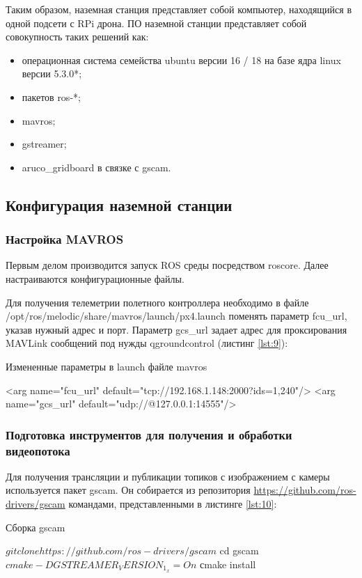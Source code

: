 Таким образом, наземная станция представляет собой компьютер, находящийся в одной подсети с RPi дрона.
ПО наземной станции представляет собой совокупность таких решений как:
\begin{itemize}
	\item операционная система семейства ubuntu версии 16 / 18 на базе ядра linux версии 5.3.0*;
	\item пакетов ros-*;
	\item mavros;
	\item gstreamer;
	\item aruco\_gridboard в связке с gscam.
\end{itemize}

\subsection{Конфигурация наземной станции}

\subsubsection{Настройка MAVROS}

Первым делом производится запуск ROS среды посредством roscore. Далее настраиваются конфигурационные файлы.

Для получения телеметрии полетного контроллера необходимо в файле /opt/ros/melodic/share/mavros/launch/px4.launch поменять параметр fcu\_url, указав нужный адрес и порт. Параметр gcs\_url задает адрес для проксирования MAVLink сообщений под нужды qgroundcontrol (листинг \ref{lst:9}):
\begin{Program}[H]
	\caption{Измененные параметры в launch файле mavros} \label{lst:9}
	\begin{MyCode}
	<arg name="fcu_url" default="tcp://192.168.1.148:2000?ids=1,240"/>   
	<arg name="gcs_url" default="udp://@127.0.0.1:14555"/>
	\end{MyCode}
\end{Program}

\subsubsection{Подготовка инструментов для получения и обработки видеопотока}
Для получения трансляции и публикации топиков с изображением с камеры используется пакет gscam. Он собирается из репозитория \url{https://github.com/ros-drivers/gscam} командами, представленными в листинге \ref{lst:10}:
\begin{Program}[H]
	\caption{Сборка gscam} \label{lst:10}
	\begin{MyCode}
	$ git clone https://github.com/ros-drivers/gscam
	$ cd gscam
	$ cmake -DGSTREAMER_VERSION_1_x=On
	$ сmake install
	\end{MyCode}
\end{Program}

